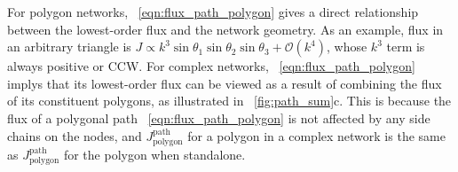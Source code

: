 \documentclass[
 preprint,
 preprintnumbers,
 amsmath,amssymb,
 aps,
 pre,
 longbibliography,
 superscriptaddress,
 10pt, twocolumn
]{revtex4-1}
\begin{document}
For polygon networks, \eqnname~\eqref{eqn:flux_path_polygon} gives a direct relationship between the lowest-order flux and the network geometry. As an example, flux in an arbitrary triangle is $J \propto k^3 \sin\theta_1\sin\theta_2\sin\theta_3 + \mathcal{O}(k^4)$, whose $k^3$ term is always positive or CCW.
For complex networks, \eqnname~\eqref{eqn:flux_path_polygon} implys that its lowest-order flux can be viewed as a result of combining the flux of its constituent polygons, as illustrated in \figurename~\ref{fig:path_sum}c. This is because the flux of a polygonal path \eqnname~\eqref{eqn:flux_path_polygon} is not affected by any side chains on the nodes, and $J^\text{path}_\text{polygon}$ for a polygon in a complex network is the same as $J^\text{path}_\text{polygon}$ for the polygon when standalone.

\end{document}
